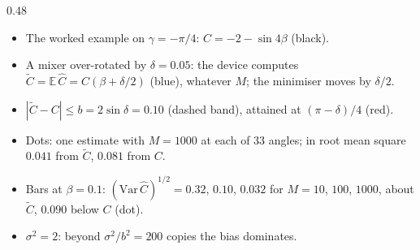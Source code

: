 \documentclass[handoutsbeamer.tex]{subfiles}
\begin{document}
\begin{frame}
{\begin{columns}[c]
\begin{column}{0.48\textwidth}
\begin{itemize}
    \item The worked example on $\gamma = -\pi/4$: $C = -2-\sin4\beta$ (black).
    \item A mixer over-rotated by $\delta = 0.05$: the device computes $\tilde C = \mathbb E\,\hat C = C(\beta+\delta/2)$ (blue), whatever $M$; the minimiser moves by $\delta/2$.
    \item $|\tilde C-C|\le b = 2\sin\delta = 0.10$ (dashed band), attained at $(\pi-\delta)/4$ (red).
    \item Dots: one estimate with $M = 1000$ at each of $33$ angles; in root mean square $0.041$ from $\tilde C$, $0.081$ from $C$.
    \item Bars at $\beta = 0.1$: $(\mathrm{Var}\,\hat C)^{1/2} = 0.32$, $0.10$, $0.032$ for $M = 10$, $100$, $1000$, about $\tilde C$, $0.090$ below $C$ (dot).
    \item $\sigma^2 = 2$: beyond $\sigma^2/b^2 = 200$ copies the bias dominates.
\end{itemize}\end{column}\end{columns}}
\end{frame}
\end{document}
